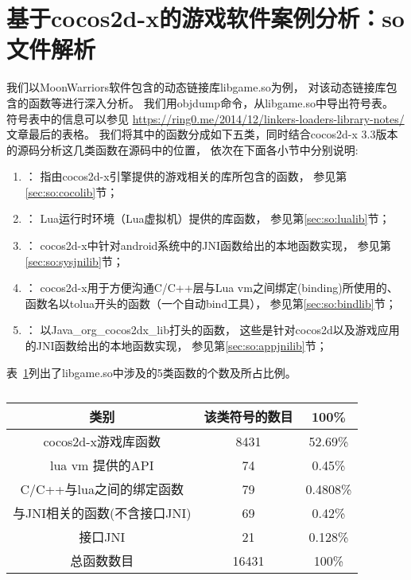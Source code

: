 \section{基于cocos2d-x的游戏软件案例分析：so文件解析}
\label{soanalysis}
我们以MoonWarriors软件包含的动态链接库libgame.so为例，
对该动态链接库包含的函数等进行深入分析。
我们用objdump命令，从libgame.so中导出符号表。
符号表中的信息可以参见
\url{https://ring0.me/2014/12/linkers-loaders-library-notes/}文章最后的表格。
我们将其中的函数分成如下五类，同时结合cocos2d-x 3.3版本的源码分析这几类函数在源码中的位置，
依次在下面各小节中分别说明:
\begin{enumerate}
\item {}：
	指由cocos2d-x引擎提供的游戏相关的库所包含的函数，
	参见第\ref{sec:so:cocolib}节；
\item {}：
	Lua运行时环境（Lua虚拟机）提供的库函数，
	参见第\ref{sec:so:lualib}节；
\item {}：
	cocos2d-x中针对android系统中的JNI函数给出的本地函数实现，
	参见第\ref{sec:so:sysjnilib}节；
\item {}：
	cocos2d-x用于方便沟通C/C++层与Lua vm之间绑定(binding)所使用的、
	函数名以tolua开头的函数（一个自动bind工具），
	参见第\ref{sec:so:bindlib}节；
\item {}：
	以Java\_org\_cocos2dx\_lib打头的函数，
	这些是针对cocos2d以及游戏应用的JNI函数给出的本地函数实现，
	参见第\ref{sec:so:appjnilib}节；
\end{enumerate}

表~\ref{table:so:fun}列出了libgame.so中涉及的5类函数的个数及所占比例。
\begin{table}[H]
\begin{center}
\caption{}
\label{table:so:fun}
\begin{tabular}{|c|c|c|}
\hline 类别 & 该类符号的数目 & 100\% \\
\hline cocos2d-x游戏库函数& 8431 & 52.69\%  \\
\hline  lua vm 提供的API & 74 & 0.45\% \\
\hline C/C++与lua之间的绑定函数 & 79 &  0.4808\% \\
\hline 与JNI相关的函数(不含接口JNI) & 69 & 0.42\%\\
\hline 接口JNI & 21 & 0.128\%\\
\hline 总函数数目 & 16431 & 100\%  \\
\hline
\end{tabular}
\end{center}
\end{table}

